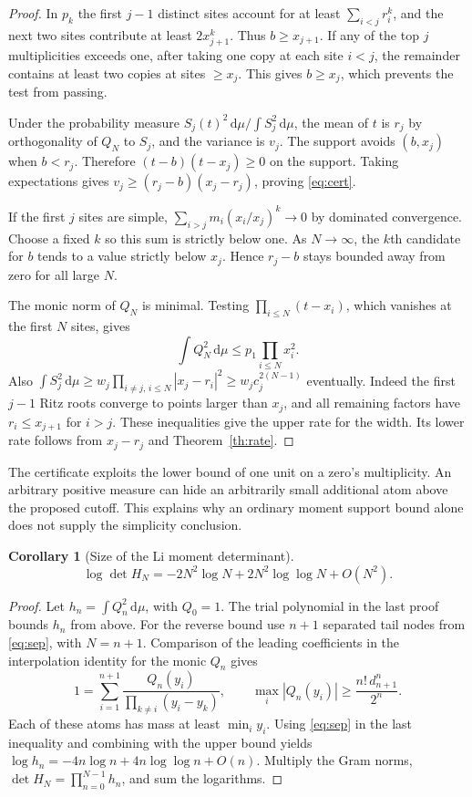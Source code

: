 \documentclass[11pt]{article}
\newtheorem{corollary}[theorem]{Corollary}
\newcommand{\dd}{\,\mathrm d}
\begin{document}
\begin{proof}
In $p_k$ the first $j-1$ distinct sites account for at least $\sum_{i<j}r_i^k$, and the next two sites contribute at least $2x_{j+1}^k$. Thus $b\ge x_{j+1}$. If any of the top $j$ multiplicities exceeds one, after taking one copy at each site $i<j$, the remainder contains at least two copies at sites $\ge x_j$. This gives $b\ge x_j$, which prevents the test from passing.

Under the probability measure $S_j(t)^2\dd\mu/\int S_j^2\dd\mu$, the mean of $t$ is $r_j$ by orthogonality of $Q_N$ to $S_j$, and the variance is $v_j$. The support avoids $(b,x_j)$ when $b<r_j$. Therefore $(t-b)(t-x_j)\ge0$ on the support. Taking expectations gives $v_j\ge(r_j-b)(x_j-r_j)$, proving \eqref{eq:cert}.

If the first $j$ sites are simple, $\sum_{i>j}m_i(x_i/x_j)^k\to0$ by dominated convergence. Choose a fixed $k$ so this sum is strictly below one. As $N\to\infty$, the $k$th candidate for $b$ tends to a value strictly below $x_j$. Hence $r_j-b$ stays bounded away from zero for all large $N$.

The monic norm of $Q_N$ is minimal. Testing $\prod_{i\le N}(t-x_i)$, which vanishes at the first $N$ sites, gives
\[
 \int Q_N^2\dd\mu\le p_1\prod_{i\le N}x_i^2.
\]
Also $\int S_j^2\dd\mu\ge w_j\prod_{i\ne j,\,i\le N}|x_j-r_i|^2\ge w_j c_j^{2(N-1)}$ eventually. Indeed the first $j-1$ Ritz roots converge to points larger than $x_j$, and all remaining factors have $r_i\le x_{j+1}$ for $i>j$. These inequalities give the upper rate for the width. Its lower rate follows from $x_j-r_j$ and Theorem~\ref{th:rate}.
\end{proof}

The certificate exploits the lower bound of one unit on a zero's multiplicity. An arbitrary positive measure can hide an arbitrarily small additional atom above the proposed cutoff. This explains why an ordinary moment support bound alone does not supply the simplicity conclusion.

\begin{corollary}[Size of the Li moment determinant]
\[
 \log\det H_N=-2N^2\log N+2N^2\log\log N+O(N^2).
\]
\end{corollary}
\begin{proof}
Let $h_n=\int Q_n^2\dd\mu$, with $Q_0=1$. The trial polynomial in the last proof bounds $h_n$ from above. For the reverse bound use $n+1$ separated tail nodes from \eqref{eq:sep}, with $N=n+1$. Comparison of the leading coefficients in the interpolation identity for the monic $Q_n$ gives
\[
 1=\sum_{i=1}^{n+1}\frac{Q_n(y_i)}{\prod_{k\ne i}(y_i-y_k)},\qquad
 \max_i|Q_n(y_i)|\ge \frac{n!\,d_{n+1}^n}{2^n}.
\]
Each of these atoms has mass at least $\min_i y_i$. Using \eqref{eq:sep} in the last inequality and combining with the upper bound yields $\log h_n=-4n\log n+4n\log\log n+O(n)$. Multiply the Gram norms, $\det H_N=\prod_{n=0}^{N-1}h_n$, and sum the logarithms.
\end{proof}
\end{document}
